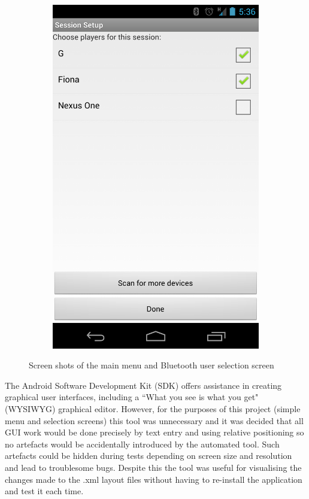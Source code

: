 \begin{figure}
\begin{subfigure}[b]{0.3\textwidth}
\includegraphics[scale=0.15]{userSelection}
\end{subfigure}
\caption{Screen shots of the main menu and Bluetooth user selection screen}
\label{userSelection}
\end{figure}


The Android Software Development Kit (SDK) offers assistance in creating graphical user interfaces, including a ``What you see is what you get" (WYSIWYG) graphical editor. However, for the purposes of this project (simple menu and selection screens) this tool was unnecessary and it was decided that all GUI work would be done precisely by text entry and using relative positioning so no artefacts would be accidentally introduced by the automated tool. Such artefacts could be hidden during tests depending on screen size and resolution and lead to troublesome bugs. Despite this the tool was useful for visualising the changes made to the .xml layout files without having to re-install the application and test it each time.


